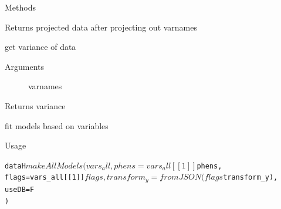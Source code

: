 \documentclass[letterpaper]{book}
\begin{document}
\begin{Section}{Methods}
\begin{SubSection}{}
%
\begin{SubSubSection}{Returns}
projected data after projecting out varnames

\end{SubSubSection}

\end{SubSection}




\hypertarget{method-dataH-getVariance}{}
%
\begin{SubSection}{}
get variance of data
%

%
\begin{SubSubSection}{Arguments}

\begin{description}

\item[] varnames

\end{description}



\end{SubSubSection}

%
\begin{SubSubSection}{Returns}
variance

\end{SubSubSection}

\end{SubSection}




\hypertarget{method-dataH-makeAllModels}{}
%
\begin{SubSection}{}
fit models based on variables
%
\begin{SubSubSection}{Usage}

\begin{alltt}dataH$makeAllModels(
  vars_all,
  phens = vars_all[[1]]$phens,
  flags = vars_all[[1]]$flags,
  transform_y = fromJSON(flags$transform_y),
  useDB = F
)\end{alltt}



\end{SubSubSection}


\end{SubSection}
\end{Section}
\end{document}
